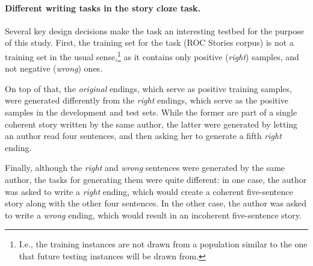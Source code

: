 \documentclass[11pt,a4paper]{article}
\newcommand{\resolved}[1]{}
\newcommand{\roy}[1]{{\color{orange}\textsc{[#1 --rs]}}}
\newcommand{\yc}[1]{{\color{bblue}\{\textit{#1}\}$_{yc}$}}
\newcommand{\nascomment}[1]{{\color{blue}\textsc{[#1 --nas]}}}
\newcommand{\clinic}[1]{{\color{magenta}\textsc{[#1 --CLINIC]}}}
\renewcommand{\roy}[1]{{\color{orange}[#1 --rs]}}
\renewcommand{\roy}[1]{#1}
\renewcommand{\nascomment}[1]{}
\renewcommand{\yc}[1]{}
\begin{document}
\paragraph{Different writing tasks in the story cloze task.}
Several key design decisions make the task an interesting testbed for the purpose of this study.\resolved{\clinic{Which purpose?}}
First, the training set for the task (ROC Stories corpus) is not a
training set in the usual sense,\footnote{I.e., the training
  instances are not drawn from a population similar to the one that future
  testing instances will be drawn from.%
}  as it contains only positive ({\it right}) samples, and not negative ({\it wrong}) ones. 
 \resolved{\yc{As far as I understand, this was intentional --- they didn't want
  people to pick up on random superfluous cues that can inevidently
  get into the data creation process, exactly the kind that our work
  picks up. Given that, stating this can be viewed as
  misunderstanding, I'm afraid.} \nascomment{We should maybe say that
  they did this intentionally and concede that our approach goes
  against the intentions of their task design.  But a task that
  insists that systems avoid using features that might encode one kind
of information (like style) is absurd.  Alternately, we could reframe
this not as ``things weren't controlled for'' but instead stick to the
facts here and just describe what they did without judgment.}}

On top of that, the {\it original} endings, which serve as positive training samples, were generated differently from the {\it right} endings, which serve as the positive samples in the development and test sets. 
While the former are part of a single coherent story written by the same author, the latter were generated by letting an author read four sentences, 
and then asking her to generate a fifth {\it right} ending. 

Finally, although the {\it right} and {\it wrong} sentences were generated by the same author, 
the tasks for generating them were quite different: in one case, the author was asked to write a {\it right} ending, which would create a coherent five-sentence story along with the other four sentences. In the other case, the author was asked to write a {\it wrong} ending, which would result in an incoherent five-sentence story. 
 \resolved{In this work, we show that these differences are significant and
impose different writing styles on authors. \nascomment{this bit feels
  a little heavy and reptititive.}}
\end{document}
